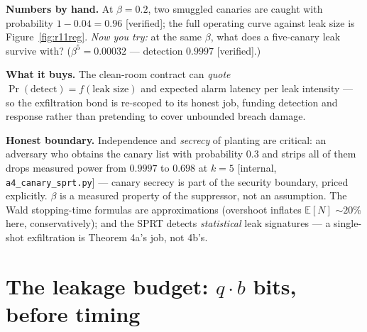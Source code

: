 \documentclass[11pt,a4paper]{article}
\begin{document}
\textbf{Numbers by hand.} At $\beta=0.2$, two smuggled canaries are caught with probability $1-0.04=0.96$ [verified]; the full
operating curve against leak size is Figure~\ref{fig:r11reg}.
\emph{Now you try:} at the same $\beta$, what does a five-canary leak survive with? ($\beta^5=0.00032$ --- detection $0.9997$ [verified].)



\textbf{What it buys.} The clean-room contract can \emph{quote} $\Pr(\text{detect})=f(\text{leak size})$ and expected alarm
latency per leak intensity --- so the exfiltration bond is re-scoped to its honest job, funding detection and response rather than
pretending to cover unbounded breach damage.

\begin{boundary}
\textbf{Honest boundary.} Independence and \emph{secrecy} of planting are critical: an adversary who obtains the canary list
with probability $0.3$ and strips all of them drops measured power from $0.9997$ to $0.698$ at $k{=}5$ [internal,
\texttt{a4\_canary\_sprt.py}] --- canary secrecy is part of the security boundary, priced explicitly. $\beta$ is a measured
property of the suppressor, not an assumption. The Wald stopping-time formulas are approximations (overshoot inflates
$\mathbb{E}[N]$ ${\sim}20\%$ here, conservatively); and the SPRT detects \emph{statistical} leak signatures --- a single-shot
exfiltration is Theorem 4a's job, not 4b's.
\end{boundary}

\section{The leakage budget: $q\cdot b$ bits, before timing}\label{sec:budget}
\end{document}
